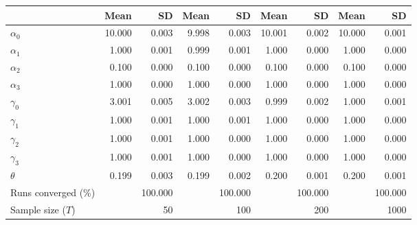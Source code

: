 
\begin{tabular}[t]{lrrrrrrrr}
\toprule
  & Mean & SD & Mean  & SD  & Mean   & SD   & Mean    & SD   \\
\midrule
$\alpha_{0}$ & 10.000 & 0.003 & 9.998 & 0.003 & 10.001 & 0.002 & 10.000 & 0.001\\
$\alpha_{1}$ & 1.000 & 0.001 & 0.999 & 0.001 & 1.000 & 0.000 & 1.000 & 0.000\\
$\alpha_{2}$ & 0.100 & 0.000 & 0.100 & 0.000 & 0.100 & 0.000 & 0.100 & 0.000\\
$\alpha_{3}$ & 1.000 & 0.000 & 1.000 & 0.000 & 1.000 & 0.000 & 1.000 & 0.000\\
$\gamma_{0}$ & 3.001 & 0.005 & 3.002 & 0.003 & 0.999 & 0.002 & 1.000 & 0.001\\
$\gamma_{1}$ & 1.000 & 0.001 & 1.000 & 0.001 & 1.000 & 0.000 & 1.000 & 0.000\\
$\gamma_{2}$ & 1.000 & 0.001 & 1.000 & 0.000 & 1.000 & 0.000 & 1.000 & 0.000\\
$\gamma_{3}$ & 1.000 & 0.001 & 1.000 & 0.000 & 1.000 & 0.000 & 1.000 & 0.000\\
$\theta$ & 0.199 & 0.003 & 0.199 & 0.002 & 0.200 & 0.001 & 0.200 & 0.001\\
Runs converged (\%) &  & 100.000 &  & 100.000 &  & 100.000 &  & 100.000\\
Sample size ($T$) &  & 50 &  & 100 &  & 200 &  & 1000\\
\bottomrule
\end{tabular}
